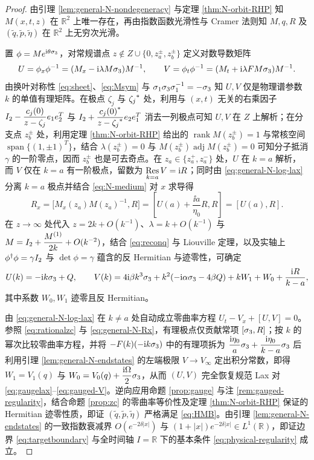 \begin{proof}
由引理 \ref{lem:general-N-nondegeneracy} 与定理 \ref{thm:N-orbit-RHP} 知 $M(x,t,z)$ 在 $\mathbb R^2$ 上唯一存在，再由指数函数光滑性与 Cramer 法则知 $M,q,R$ 及 $(\widetilde q,\widetilde p,\widetilde\eta)$ 在 $\mathbb R^2$ 上无穷次光滑。

置 $\phi=Me^{\mathrm{i}\theta\sigma_3}$，对常规谱点 $z\notin Z\cup\{0,z_a^\pm,z_b^\pm\}$ 定义对数导数矩阵
\begin{equation}\label{eq:general-N-log-lax}
U=\phi_x\phi^{-1}=(M_x-\mathrm{i}\lambda M\sigma_3)M^{-1},\qquad
V=\phi_t\phi^{-1}=(M_t+\mathrm{i}\lambda FM\sigma_3)M^{-1}.
\end{equation}
由换叶对称性 \eqref{eq:sheet}、\eqref{eq:Msym} 与 $\sigma_1\sigma_3\sigma_1^{-1}=-\sigma_3$ 知 $U,V$ 仅是物理谱参数 $k$ 的单值有理矩阵。在极点 $\zeta_j$ 与 ${\zeta_j}^{*}$ 处，利用与 $(x,t)$ 无关的右乘因子 $I_2-\dfrac{c_j(0)}{z-\zeta_j}e_1e_2^T$ 与 $I_2+\dfrac{{c_j(0)}^{*}}{z-{\zeta_j}^{*}}e_2e_1^T$ 消去一列极点可知 $U,V$ 在 $Z$ 上解析；在分支点 $z_b^\pm$ 处，利用定理 \ref{thm:N-orbit-RHP} 给出的 $\operatorname{rank}M(z_b^\pm)=1$ 与常核空间 $\operatorname{span}\{(1,\pm1)^T\}$，结合 $\lambda(z_b^\pm)=0$ 与 $M(z_b^\pm)\operatorname{adj}M(z_b^\pm)=0$ 可知分子抵消 $\gamma$ 的一阶零点，因而 $z_b^\pm$ 也是可去奇点。在 $z_a\in\{z_a^+,z_a^-\}$ 处，$U$ 在 $k=a$ 解析，而 $V$ 仅在 $k=a$ 有一阶极点，留数为 $\operatorname*{Res}\limits_{k=a}V=\mathrm{i} R$；同时由 \eqref{eq:general-N-log-lax} 分离 $k=a$ 极点并结合 \eqref{eq:N-medium} 对 $x$ 求导得
\begin{equation}\label{eq:general-N-Rx}
R_x=\bigl[M_x(z_a)M(z_a)^{-1},R\bigr]=\left[U(a)+\dfrac{\ii a}{\eta_0}R,R\right]=[U(a),R].
\end{equation}
在 $z\to\infty$ 处代入 $z=2k+O(k^{-1})$、$\lambda=k+O(k^{-1})$ 与 $M=I_2+\dfrac{M^{(1)}}{2k}+O(k^{-2})$，结合 \eqref{eq:reconq} 与 Liouville 定理，以及实轴上 $\phi^\dagger\phi=\gamma I_2$ 与 $\det\phi=\gamma$ 蕴含的反 Hermitian 与迹零性，可确定
\begin{equation*}
U(k)=-\mathrm{i} k\sigma_3+Q,\qquad
V(k)=4\mathrm{i}\beta k^3\sigma_3+k^2(-\mathrm{i}\alpha\sigma_3-4\beta Q)+kW_1+W_0+\dfrac{\mathrm{i} R}{k-a},
\end{equation*}
其中系数 $W_0,W_1$ 迹零且反 Hermitian。

由 \eqref{eq:general-N-log-lax} 在 $k\ne a$ 处自动成立零曲率方程 $U_t-V_x+[U,V]=0$。参照 \eqref{eq:rationalzc} 与 \eqref{eq:general-N-Rx}，有理极点仅贡献常项 $[\sigma_3,R]$；按 $k$ 的幂次比较零曲率方程，并将 $-F(k)(-\mathrm{i} k\sigma_3)$ 中的有理项拆为 $\dfrac{\mathrm{i}\eta_0}{a}\sigma_3+\dfrac{\mathrm{i}\eta_0}{k-a}\sigma_3$ 后利用引理 \ref{lem:general-N-endstates} 的左端极限 $V\to V_\infty$ 定出积分常数，即得 $W_1=V_1(q)$ 与 $W_0=V_0(q)+\dfrac{\mathrm{i}\Omega}{2}\sigma_3$，从而 $(U,V)$ 完全恢复规范 Lax 对 \eqref{eq:gaugelax}--\eqref{eq:gauged-V}。逆向应用命题 \ref{prop:gauge} 与注 \ref{rem:gauged-regularity}，结合命题 \ref{prop:zc} 的零曲率等价性及定理 \ref{thm:N-orbit-RHP} 保证的 Hermitian 迹零性质，即证 $(\widetilde q,\widetilde p,\widetilde\eta)$ 严格满足 \eqref{eq:HMB}。由引理 \ref{lem:general-N-endstates} 的一致指数衰减界 $O(e^{-2\delta|x|})$ 与 $(1+|x|)e^{-2\delta|x|}\in L^1(\mathbb R)$，即证边界 \eqref{eq:targetboundary} 与全时间轴 $I=\mathbb R$ 下的基本条件 \eqref{eq:physical-regularity} 成立。


\end{proof}
